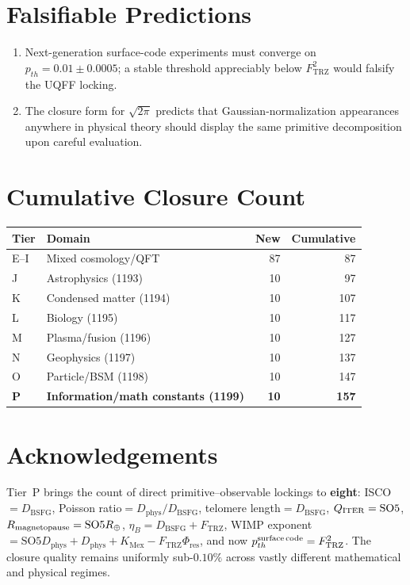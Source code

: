 \documentclass[11pt]{article}
\newcommand{\Ftrz}{F_{\mathrm{TRZ}}}
\newcommand{\Phires}{\Phi_{\mathrm{res}}}
\newcommand{\KMex}{K_{\mathrm{Mex}}}
\newcommand{\Dphys}{D_{\mathrm{phys}}}
\newcommand{\Dbsfg}{D_{\mathrm{BSFG}}}
\newcommand{\SOfive}{\mathrm{SO5}}
\begin{document}
\section{Falsifiable Predictions}
\begin{enumerate}
\item Next-generation surface-code experiments must converge on $p_{th} = 0.01\pm 0.0005$;
a stable threshold appreciably below $\Ftrz^2$ would falsify the UQFF locking.
\item The closure form for $\sqrt{2\pi}$ predicts that Gaussian-normalization
appearances anywhere in physical theory should display the same primitive decomposition
upon careful evaluation.
\end{enumerate}

\section{Cumulative Closure Count}

\begin{tabular}{@{}llrr@{}}
\toprule
Tier & Domain & New & Cumulative \\
\midrule
E--I & Mixed cosmology/QFT & 87 & 87 \\
J & Astrophysics (1193) & 10 & 97 \\
K & Condensed matter (1194) & 10 & 107 \\
L & Biology (1195) & 10 & 117 \\
M & Plasma/fusion (1196) & 10 & 127 \\
N & Geophysics (1197) & 10 & 137 \\
O & Particle/BSM (1198) & 10 & 147 \\
\textbf{P} & \textbf{Information/math constants (1199)} & \textbf{10} & \textbf{157} \\
\bottomrule
\end{tabular}

\section{Acknowledgements}
Tier~P brings the count of direct primitive--observable lockings to \textbf{eight}:
ISCO$=\Dbsfg$, Poisson ratio$=\Dphys/\Dbsfg$, telomere length$=\Dbsfg$,
$Q_{\rm ITER}=\SOfive$, $R_{\rm magnetopause}=\SOfive R_\oplus$,
$\eta_B = \Dbsfg+\Ftrz$, WIMP exponent $=\SOfive\Dphys+\Dphys+\KMex-\Ftrz\Phires$,
and now $p_{th}^{\rm surface\,code}=\Ftrz^2$. The closure quality remains uniformly
sub-$0.10\%$ across vastly different mathematical and physical regimes.
\end{document}
